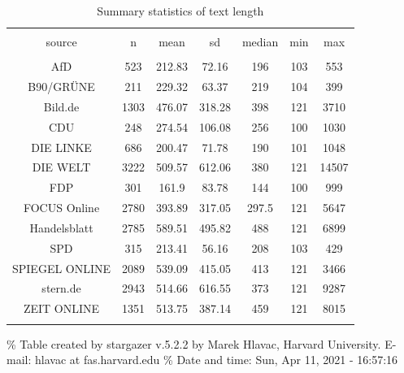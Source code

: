 \documentclass[
]{article}
\begin{document}
\begin{table}[!htbp] \centering 
  \caption{Summary statistics of text length} 
  \label{table:text_length} 
\begin{tabular}{@{\extracolsep{5pt}} ccccccc} 
\\[-1.8ex]\hline 
\hline \\[-1.8ex] 
source & n & mean & sd & median & min & max \\ 
\hline \\[-1.8ex] 
AfD & 523 & 212.83 & 72.16 & 196 & 103 & 553 \\ 
B90/GRÜNE & 211 & 229.32 & 63.37 & 219 & 104 & 399 \\ 
Bild.de & 1303 & 476.07 & 318.28 & 398 & 121 & 3710 \\ 
CDU & 248 & 274.54 & 106.08 & 256 & 100 & 1030 \\ 
DIE LINKE & 686 & 200.47 & 71.78 & 190 & 101 & 1048 \\ 
DIE WELT & 3222 & 509.57 & 612.06 & 380 & 121 & 14507 \\ 
FDP & 301 & 161.9 & 83.78 & 144 & 100 & 999 \\ 
FOCUS Online & 2780 & 393.89 & 317.05 & 297.5 & 121 & 5647 \\ 
Handelsblatt & 2785 & 589.51 & 495.82 & 488 & 121 & 6899 \\ 
SPD & 315 & 213.41 & 56.16 & 208 & 103 & 429 \\ 
SPIEGEL ONLINE & 2089 & 539.09 & 415.05 & 413 & 121 & 3466 \\ 
stern.de & 2943 & 514.66 & 616.55 & 373 & 121 & 9287 \\ 
ZEIT ONLINE & 1351 & 513.75 & 387.14 & 459 & 121 & 8015 \\ 
\hline \\[-1.8ex] 
\end{tabular} 
\end{table}

\% Table created by stargazer v.5.2.2 by Marek Hlavac, Harvard
University. E-mail: hlavac at fas.harvard.edu \% Date and time: Sun, Apr
11, 2021 - 16:57:16
\end{document}
